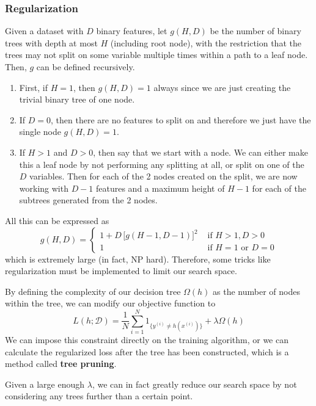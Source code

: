 \documentclass{article}
\begin{document}
    \subsubsection{Regularization}

      Given a dataset with $D$ binary features, let $g(H, D)$ be the number of binary trees with depth at most $H$ (including root node), with the restriction that the trees may not split on some variable multiple times within a path to a leaf node. Then, $g$ can be defined recursively. 
      \begin{enumerate}
          \item First, if $H = 1$, then $g(H, D) = 1$ always since we are just creating the trivial binary tree of one node. 
          \item If $D = 0$, then there are no features to split on and therefore we just have the single node $g(H, D) = 1$. 
          \item If $H > 1$ and $D > 0$, then say that we start with a node. We can either make this a leaf node by not performing any splitting at all, or split on one of the $D$ variables. Then for each of the 2 nodes created on the split, we are now working with $D-1$ features and a maximum height of $H-1$ for each of the subtrees generated from the 2 nodes. 
      \end{enumerate}
      All this can be expressed as 
      \[g(H, D) = \begin{cases} 1 + D \, \big[ g(H - 1, D - 1) \big]^2 & \text{ if } H > 1, D > 0 \\ 1 & \text{ if } H = 1 \text{ or } D = 0 \end{cases} \]
      which is extremely large (in fact, NP hard). Therefore, some tricks like regularization must be implemented to limit our search space. 

      By defining the complexity of our decision tree $\Omega(h)$ as the number of nodes within the tree, we can modify our objective function to 
      \[L(h; \mathcal{D}) = \frac{1}{N} \sum_{i=1}^N 1_{\{y^{(i)} \neq h(x^{(i)})\}} + \lambda \Omega(h)\]
      We can impose this constraint directly on the training algorithm, or we can calculate the regularized loss after the tree has been constructed, which is a method called \textbf{tree pruning}. 

      Given a large enough $\lambda$, we can in fact greatly reduce our search space by not considering any trees further than a certain point. 
\end{document}
